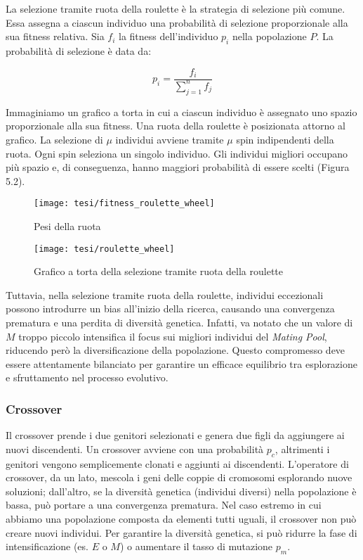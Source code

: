 La selezione tramite ruota della roulette è la strategia di selezione più comune. Essa assegna a ciascun individuo una probabilità di selezione proporzionale alla sua fitness relativa. Sia $f_i$ la fitness dell'individuo $p_i$ nella popolazione $P$. La probabilità di selezione è data da:

\[ p_i = \frac{f_i}{\sum_{j=1}^{n} f_j} \]

Immaginiamo un grafico a torta in cui a ciascun individuo è assegnato uno spazio proporzionale alla sua fitness. Una ruota della roulette è posizionata attorno al grafico. La selezione di $\mu$ individui avviene tramite $\mu$ spin indipendenti della ruota. Ogni spin seleziona un singolo individuo. Gli individui migliori occupano più spazio e, di conseguenza, hanno maggiori probabilità di essere scelti (Figura 5.2).

\begin{figure}[!ht] 
    \centering 
    \texttt{[image: tesi/fitness\_roulette\_wheel]} 
    \caption{Pesi della ruota}
\end{figure}

\begin{figure}[!ht] 
    \centering 
    \texttt{[image: tesi/roulette\_wheel]} 
    \caption{Grafico a torta della selezione tramite ruota della roulette}
\end{figure}

Tuttavia, nella selezione tramite ruota della roulette, individui eccezionali possono introdurre un bias all'inizio della ricerca, causando una convergenza prematura e una perdita di diversità genetica. Infatti, va notato che un valore di \( M \) troppo piccolo intensifica il focus sui migliori individui del \emph{Mating Pool}, riducendo però la diversificazione della popolazione. Questo compromesso deve essere attentamente bilanciato per garantire un efficace equilibrio tra esplorazione e sfruttamento nel processo evolutivo.

\subsubsection{Crossover}
Il crossover prende i due genitori selezionati e genera due figli da aggiungere ai nuovi discendenti. Un crossover avviene con una probabilità $p_c$, altrimenti i genitori vengono semplicemente clonati e aggiunti ai discendenti. L'operatore di crossover, da un lato, mescola i geni delle coppie di cromosomi esplorando nuove soluzioni; dall'altro, se la diversità genetica (individui diversi) nella popolazione è bassa, può portare a una convergenza prematura. Nel caso estremo in cui abbiamo una popolazione composta da elementi tutti uguali, il crossover non può creare nuovi individui. Per garantire la diversità genetica, si può ridurre la fase di intensificazione (es. $E$ o $M$) o aumentare il tasso di mutazione $p_m$.

